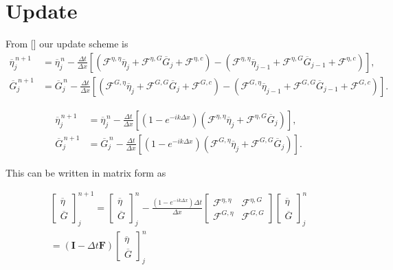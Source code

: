 \documentclass[12pt]{article}
\newcommand{\matr}[1]{\mathbf{#1}}
\begin{document}
\section{Update}
 From [] our update scheme is
 \begin{align*}
 \overline{\eta}_{j}^{\,n + 1} &=  \overline{\eta}^{\,n }_{j} - \frac{\Delta t}{\Delta x}  \left[ \left(\mathcal{F}^{\eta,\eta} \overline{\eta}_j  + \mathcal{F}^{\eta,G} \overline{G}_j + \mathcal{F}^{\eta,c} \right) - \left(\mathcal{F}^{\eta,\eta} \overline{\eta}_{j-1}  + \mathcal{F}^{\eta,G} \overline{G}_{j-1} + \mathcal{F}^{\eta,c} \right)  \right], \\
 \overline{G}^{\,n + 1}_{j} &= \overline{G}^{\,n }_{j} -\frac{\Delta t}{\Delta x}  \left[ \left(  \mathcal{F}^{G,\eta} \overline{\eta}_{j}  + \mathcal{F}^{G,G} \overline{G}_j + \mathcal{F}^{G,c} \right) - \left(  \mathcal{F}^{G,\eta} \overline{\eta}_{j-1}  + \mathcal{F}^{G,G} \overline{G}_{j-1} + \mathcal{F}^{G,c} \right) \right].
 \end{align*}
 
 \begin{align*}
 \overline{\eta}_{j}^{\,n + 1} &=  \overline{\eta}^{\,n }_{j} - \frac{\Delta t}{\Delta x}  \left[ \left(1 - e^{-ik\Delta x}\right) \left(\mathcal{F}^{\eta,\eta} \overline{\eta}_j  + \mathcal{F}^{\eta,G} \overline{G}_j \right) \right], \\
 \overline{G}^{\,n + 1}_{j} &= \overline{G}^{\,n }_{j} -\frac{\Delta t}{\Delta x}  \left[ \left(1 - e^{-ik\Delta x}\right)\left(  \mathcal{F}^{G,\eta} \overline{\eta}_{j}  + \mathcal{F}^{G,G} \overline{G}_j \right) \right].
 \end{align*}
 
 
 This can be written in matrix form as
 
 \begin{multline}
 \label{eqn:singleEvolveStep}
 \begin{bmatrix}
 \overline{\eta} \\ \overline{G}
 \end{bmatrix}^{n+1}_j = \begin{bmatrix}
 \overline{\eta} \\ \overline{G}
 \end{bmatrix}^{n}_j - \frac{\left(1 - e^{-ik\Delta x}\right) \Delta t}{ \Delta x}\begin{bmatrix}
 \mathcal{F}^{\eta,\eta} & \mathcal{F}^{\eta,G} \\\mathcal{F}^{G,\eta} &\mathcal{F}^{G,G} 
 \end{bmatrix}\begin{bmatrix}
 \overline{\eta} \\ \overline{G}
 \end{bmatrix}^{n}_j \\= \left(\matr{I}  - \Delta t \matr{F} \right) \begin{bmatrix}
 \overline{\eta} \\ \overline{G}
 \end{bmatrix}^{n}_j
 \end{multline}
 
\end{document}
